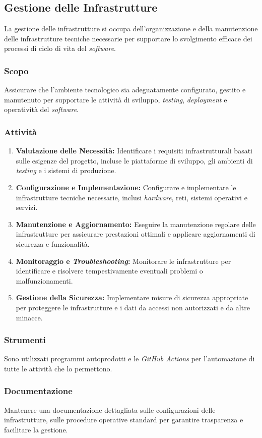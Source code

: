 \subsection{Gestione delle Infrastrutture}

La gestione delle infrastrutture si occupa dell'organizzazione e della
manutenzione delle infrastrutture tecniche necessarie per supportare lo
svolgimento efficace dei processi di ciclo di vita del \textit{software}.

\subsubsection{Scopo}
Assicurare che l'ambiente tecnologico sia adeguatamente configurato, gestito e
manutenuto per supportare le attività di sviluppo, \textit{testing},
\textit{deployment} e operatività del \textit{software}.

\subsubsection{Attività}
\begin{enumerate}
	\item \textbf{Valutazione delle Necessità:} Identificare i requisiti
	      infrastrutturali basati sulle esigenze del progetto, incluse le
	      piattaforme di sviluppo, gli ambienti di \textit{testing} e i sistemi
	      di produzione.
	\item \textbf{Configurazione e Implementazione:} Configurare e implementare
	      le infrastrutture tecniche necessarie, inclusi \textit{hardware},
	      reti, sistemi operativi e servizi.
	\item \textbf{Manutenzione e Aggiornamento:} Eseguire la manutenzione
	      regolare delle infrastrutture per assicurare prestazioni ottimali e
	      applicare aggiornamenti di sicurezza e funzionalità.
	\item \textbf{Monitoraggio e \textit{Troubleshooting}:} Monitorare le
	      infrastrutture per identificare e risolvere tempestivamente eventuali
	      problemi o malfunzionamenti.
	\item \textbf{Gestione della Sicurezza:} Implementare misure di sicurezza
	      appropriate per proteggere le infrastrutture e i dati da accessi non
	      autorizzati e da altre minacce.
\end{enumerate}

\subsubsection{Strumenti}
Sono utilizzati programmi autoprodotti e le \textit{GitHub Actions} per
l'automazione di tutte le attività che lo permettono.

\subsubsection{Documentazione}
Mantenere una documentazione dettagliata sulle configurazioni delle
infrastrutture, sulle procedure operative standard per garantire trasparenza e
facilitare la gestione.
